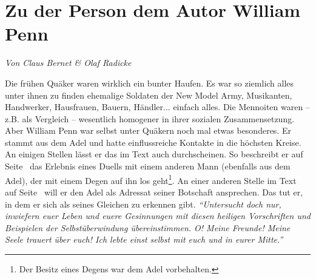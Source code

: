%
%
%



\section{Zu der Person dem Autor William Penn} \label{ref:zum_autor_penn}

\begin{flushright}
\begin{footnotesize}
\textit{Von Claus Bernet \& Olaf Radicke}
\end{footnotesize}
\end{flushright}
\smallskip

Die frühen Quäker waren wirklich ein bunter Haufen. Es war so ziemlich alles
unter ihnen zu finden ehemalige Soldaten der New Model Army, Musikanten, Handwerker, Hausfrauen, Bauern, Händler... einfach alles.
Die Mennoiten  waren --
z.B. als Vergleich -- wesentlich homogener in ihrer sozialen Zusammensetzung.
Aber
William Penn war selbst unter Quäkern noch mal etwas besonderes. Er stammt aus
dem Adel und hatte einflussreiche Kontakte in die höchsten Kreise. An einigen
Stellen lässt er das im Text auch durchscheinen. So beschreibt er auf
Seite~\pageref{kap9_ab2_duell_penn} das Erlebnis eines Duells
mit einem anderen Mann (ebenfalls aus dem Adel), der mit einem Degen auf ihn los
geht\footnote{Der Besitz eines
Degens war dem Adel vorbehalten.}. An einer anderen Stelle im Text auf
Seite~\pageref{15_04_penn_alte_freunde} will er den Adel als Adressat seiner
Botschaft ansprechen. Das tut er, in dem er sich als seines Gleichen zu erkennen
gibt.
\textit{"`Untersucht doch nur, inwiefern euer Leben und euere Gesinnungen mit
diesen heiligen Vorschriften und Beispielen der Selbstüberwindung
übereinstimmen. O! Meine Freunde! Meine Seele trauert über euch! Ich lebte einst
selbst mit euch und in eurer Mitte."'}

